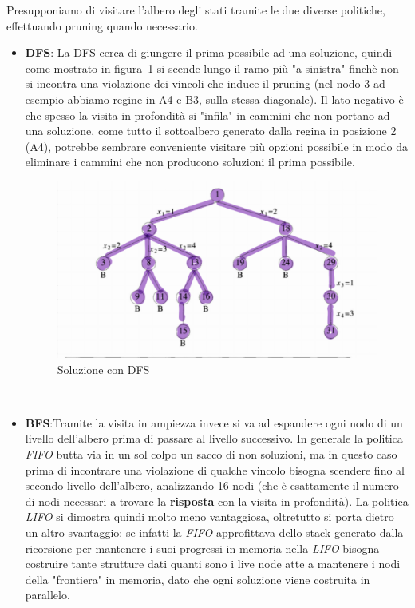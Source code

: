 \documentclass[a4paper]{article}
\begin{document}
Presupponiamo di visitare l'albero degli stati tramite le due diverse politiche, effettuando pruning quando necessario.
\begin{itemize}
	\item \textbf{DFS}: La DFS cerca di giungere il prima possibile ad una soluzione, quindi come mostrato in figura~\ref{FIG:C_2_DFS} si scende lungo il ramo più "a sinistra" finchè non si incontra una violazione dei vincoli che induce il pruning (nel nodo 3 ad esempio abbiamo regine in A4 e B3, sulla stessa diagonale).
		Il lato negativo è che spesso la visita in profondità si "infila" in cammini che non portano ad una soluzione, come tutto il sottoalbero generato dalla regina in posizione 2 (A4), potrebbe sembrare conveniente visitare più opzioni possibile in modo da eliminare i cammini che non producono soluzioni il prima possibile.
\begin{figure}[!ht]
\centering
\includegraphics[width=1\textwidth]{./img/C_2_DFS.png}
\caption{Soluzione con DFS} \label{FIG:C_2_DFS}
\end{figure}\\
	\item \textbf{BFS}:Tramite la visita in ampiezza invece si va ad espandere ogni nodo di un livello dell'albero prima di passare al livello successivo.
		In generale la politica \textit{FIFO} butta via in un sol colpo un sacco di non soluzioni, ma in questo caso prima di incontrare una violazione di qualche vincolo bisogna scendere fino al secondo livello dell'albero, analizzando 16 nodi (che è esattamente il numero di nodi necessari a trovare la \textbf{risposta} con la visita in profondità).
		La politica \textit{LIFO} si dimostra quindi molto meno vantaggiosa, oltretutto si porta dietro un altro svantaggio: se infatti la \textit{FIFO} approfittava dello stack generato dalla ricorsione per mantenere i suoi progressi in memoria nella \textit{LIFO} bisogna costruire tante strutture dati quanti sono i live node atte a mantenere i nodi della "frontiera" in memoria, dato che ogni soluzione viene costruita in parallelo.

\end{itemize}
\end{document}
